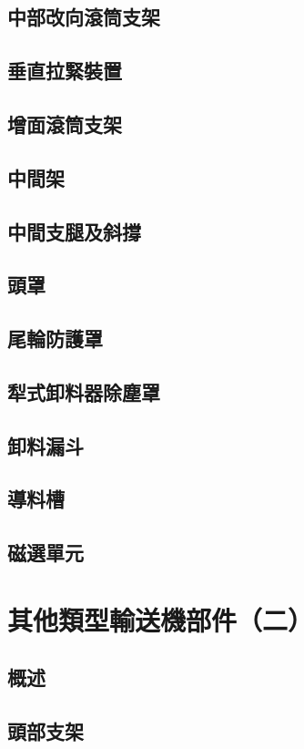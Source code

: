 \documentclass[UTF8]{ctexart}
\begin{document}
\subsection{中部改向滾筒支架}
\subsection{垂直拉緊裝置}
\subsection{增面滾筒支架}
\subsection{中間架}
\subsection{中間支腿及斜撐}
\subsection{頭罩}
\subsection{尾輪防護罩}
\subsection{犁式卸料器除塵罩}
\subsection{卸料漏斗}
\subsection{導料槽}
\subsection{磁選單元}

\newpage
\section{其他類型輸送機部件（二）}
\subsection{概述}
\subsection{頭部支架}
\end{document}
